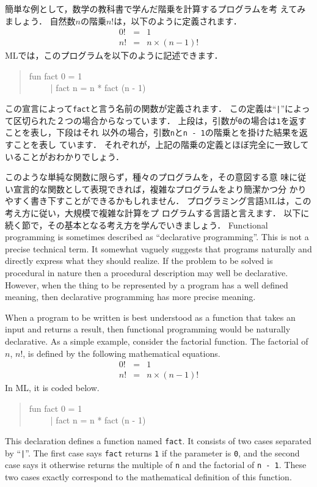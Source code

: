 \documentclass{jbook}
\begin{document}
	簡単な例として，数学の教科書で学んだ階乗を計算するプログラムを考
えてみましょう．
	自然数$n$の階乗$n !$は，以下のように定義されます．
\begin{eqnarray*}
0 ! &=& 1
\\
n ! &=& n \times (n - 1) !
\end{eqnarray*}
MLでは，このプログラムを以下のように記述できます．
\begin{tt}
\begin{quote}
fun fact 0 = 1\\
\ \ \ \ \ | fact n = n * fact (n - 1)
\end{quote}
\end{tt}
	この宣言によって{\tt fact}と言う名前の関数が定義されます．
	この定義は``{\tt |}''によって区切られた２つの場合からなっています．
	上段は，引数が{\tt 0}の場合は{\tt 1}を返すことを表し，下段はそれ
以外の場合，引数{\tt n}と{\tt n - 1}の階乗とを掛けた結果を返すことを表し
ています．
	それぞれが，上記の階乗の定義とほぼ完全に一致していることがおわかりでしょう．
	
	このような単純な関数に限らず，種々のプログラムを，その意図する意
味に従い宣言的な関数として表現できれば，複雑なプログラムをより簡潔かつ分
かりやすく書き下すことができるかもしれません．
	プログラミング言語MLは，この考え方に従い，大規模で複雑な計算をプ
ログラムする言語と言えます．
	以下に続く節で，その基本となる考え方を学んでいきましょう．
\else%
	Functional programming is sometimes described as ``declarative
programming''.
	This is not a precise technical term.
	It somewhat vaguely suggests that programs naturally and
directly express what they should realize.
	If the problem to be solved is procedural in nature then a
procedural description may well be declarative.
	However, when the thing to be represented by a program has a
well defined meaning, then declarative programming has more precise
meaning.
	
	When a program to be written is best understood as a function
that takes an input and returns a result, then functional programming
would be naturally declarative.
	As a simple example, consider the factorial function.
	The factorial of $n$,  $n !$, is defined by the following mathematical
equations.
\begin{eqnarray*}
0 ! &=& 1
\\
n ! &=& n \times (n - 1) !
\end{eqnarray*}
In ML, it is coded below.
\begin{tt}
\begin{quote}
fun fact 0 = 1\\
\ \ \ \ \ | fact n = n * fact (n - 1)
\end{quote}
\end{tt}
	This declaration defines a function named {\tt fact}.
	It consists of two cases separated by ``{\tt |}''.
	The first case says {\tt fact} returns {\tt 1} if the parameter
is {\tt 0}, and the second case says it otherwise returns the multiple
of {\tt n} and the factorial of {\tt n - 1}.
	These two cases exactly correspond to the mathematical
definition of this function.
	
\end{document}
